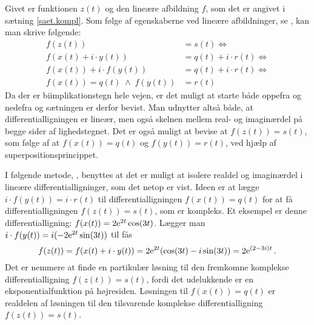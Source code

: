 \begin{bevis}
Givet er funktionen $ z(t) $ og den lineære afbildning $ f $, som det er angivet i sætning \ref{saet.kompl}. Som følge af egenskaberne ved lineære afbildninger, se , kan man skrive følgende:
\begin{equation}
\begin{aligned}
f(z(t)) &= s(t) \Leftrightarrow \\
f(x(t) + i \cdot y(t)) &= q(t) + i \cdot r(t) \Leftrightarrow \\
f(x(t)) + i\cdot f(y(t)) &= q(t) + i \cdot r(t) \Leftrightarrow \\
f(x(t)) = q(t) \; \wedge \; f(y(t)) &= r(t) 
\end{aligned}
\end{equation}
Da der er biimplikationstegn hele vejen, er det muligt at starte både oppefra og nedefra og sætningen er derfor bevist. Man udnytter altså både, at differentialligningen er lineær, men også skelnen mellem real- og imaginærdel på begge sider af lighedstegnet. Det er også muligt at bevise at $ f(z(t)) = s(t) $, som følge af at $ f(x(t)) = q(t) $ og $ f(y(t)) = r(t) $, ved hjælp af superpositionsprincippet.
\end{bevis}

I følgende metode, , benyttes at det er muligt at isolere realdel og imaginærdel i lineære differentialligninger, som det netop er vist. Ideen er at lægge $ i \cdot f(y(t)) = i \cdot r(t) $ til differentialligningen $ f(x(t)) = q(t) $ for at få differentialligningen $ f(z(t)) = s(t) $, som er kompleks. \bs 
Et eksempel er denne differentialligning: $ f(x(t)) = 2 \mathrm{e}^{2t}\cos(3t) $. Lægger man $ i \cdot f(y(t)) = i(-2\mathrm{e}^{2t}\sin(3t)) $ til fås 
\begin{equation}
f(z(t)) = f(x(t)+i\cdot y(t)) = 2 \mathrm{e}^{2t} (\cos(3t) - i \sin(3t)) = 2 \mathrm{e}^{(2-3i)t} \,.
\end{equation}
Det er nemmere at finde en partikulær løsning til den fremkomne komplekse differentialligning $ f(z(t)) = s(t) $, fordi det udelukkende er en eksponentialfunktion på højresiden. Løsningen til $ f(x(t)) = q(t) $ er realdelen af løsningen til den tilsvarende komplekse differentialligning $ f(z(t)) = s(t) $.

